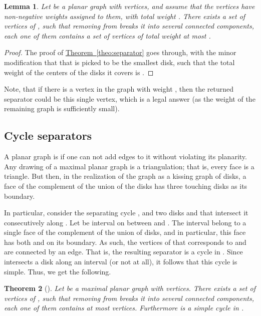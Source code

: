 \documentclass[12pt]{article}
\newtheorem{theorem}{Theorem}[section]
\newtheorem{lemma}[theorem]{Lemma}
\theoremstyle{remark}\theoremheaderfont{\sf}\theorembodyfont{\upshape}\newtheorem{defn}[theorem]{Definition}
\newcommand{\HLink}[2]{\hyperref[#2]{#1~\ref*{#2}}}
\newcommand{\lemlab}[1]{\label{lemma:#1}}
\newcommand{\thmlab}[1]{{\label{theo:#1}}}
\newcommand{\thmref}[1]{\HLink{Theorem}{theo:#1}}
\newcommand{\emphi}[1]{\emphic{#1}{#1}}
\begin{document}
\begin{lemma}\lemlab{separator:w}Let  be a planar graph with 
    vertices, and assume that the vertices have non-negative weights
    assigned to them, with total weight . There exists a set  of
     vertices of , such that removing  from
     breaks it into several connected components, each one of
    them contains a set of vertices of total weight at most .
\end{lemma}

\begin{proof}
    The proof of \thmref{separator} goes through, with the minor
    modification that that  is picked to be the smallest disk,
    such that the total weight of the centers of the disks it covers
    is .
\end{proof}

Note, that if there is a vertex in the graph with weight ,
then the returned separator could be this single vertex, which is a
legal answer (as the weight of the remaining graph is sufficiently
small).

\subsection{Cycle separators}

A planar graph  is \emphi{maximal} if one can not add edges to
it without violating its planarity. Any drawing of a maximal planar
graph is a triangulation; that is, every face is a triangle.  But
then, in the realization of the graph as a kissing graph of disks, a
face of the complement of the union of the disks has three touching
disks as its boundary. 


In particular, consider the separating cycle
, and two disks  and  that intersect it
consecutively along . Let  be interval on  between
 and . The interval  belong to a
single face of the complement of the union of disks, and in
particular, this face has both  and  on its
boundary. As such, the vertices of  that corresponds to
 and  are connected by an edge. That is, the
resulting separator is a cycle in . Since  intersects a
disk along an interval (or not at all), it follows that this cycle is
simple.  Thus, we get the following.


\begin{theorem}[\cite{m-fsscs-86}]
    \thmlab{separator:2}Let  be a maximal planar graph with
     vertices. There exists a set  of 
    vertices of , such that removing  from  breaks
    it into several connected components, each one of them contains at
    most  vertices. Furthermore  is a simple cycle
    in .
\end{theorem}
\end{document}
